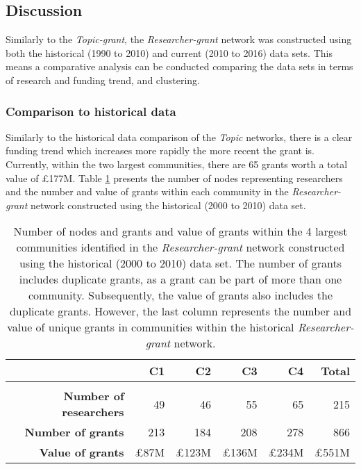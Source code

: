 \subsection{Discussion}

Similarly to the \textit{Topic-grant}, the \textit{Researcher-grant} network was constructed using both the historical (1990 to 2010) and current (2010 to 2016) data sets. This means a comparative analysis can be conducted comparing the data sets in terms of research and funding trend, and clustering.

\subsubsection{Comparison to historical data}

Similarly to the historical data comparison of the \textit{Topic} networks, there is a clear funding trend which increases more rapidly the more recent the grant is. Currently, within the two largest communities, there are 65 grants worth a total value of \pounds177M. Table \ref{table:researcher_b_past1_numbers} presents the number of nodes representing researchers and the number and value of grants within each community in the \textit{Researcher-grant} network constructed using the historical (2000 to 2010) data set.

\begin{table}[!htbp]
\centering
\caption[Number of nodes and grants and value of grants within the 4 largest communities in the \textit{Researcher-grant} network constructed using the historical (2000 to 2010) data set]{Number of nodes and grants and value of grants within the 4 largest communities identified in the \textit{Researcher-grant} network constructed using the historical (2000 to 2010) data set. The number of grants includes duplicate grants, as a grant can be part of more than one community. Subsequently, the value of grants also includes the duplicate grants. However, the last column represents the number and value of unique grants in communities within the historical \textit{Researcher-grant} network.}
\label{table:researcher_b_past1_numbers}
\begin{tabular}{r|rrrrr}
{} & \textbf{C1} & \textbf{C2} & \textbf{C3} & \textbf{C4} & \textbf{Total}\\
\hline\\
\textbf{Number of researchers} & {49}  & {46}  & {55}  & {65}  & {215}\\
\textbf{Number of grants}      & {213} & {184} & {208} & {278} & {866}\\
\textbf{Value of grants}       & {\pounds87M} & {\pounds123M} & {\pounds136M} & {\pounds234M} & {\pounds551M}\\
\end{tabular}
\end{table}

